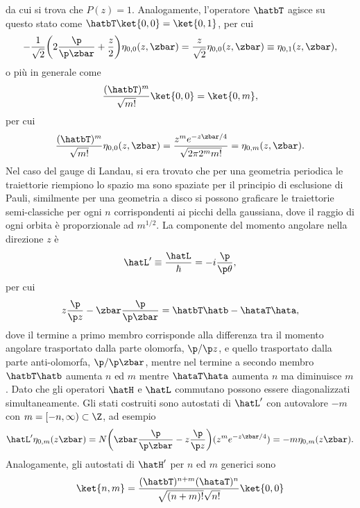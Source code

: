 da cui si trova che $P(z) = 1$. Analogamente, l'operatore $\hatbT$ agisce su questo stato come $\hatbT\ket{0,0} = \ket{0,1}$, per cui
\begin{equation}
    -\frac{1}{\sqrt{2}}\bigg(2\frac{\p}{\p\zbar} + \frac{z}{2} \bigg)\eta_{0,0}(z,\zbar) = \frac{z}{\sqrt{2}}\eta_{0,0}(z,\zbar) \equiv \eta_{0,1}(z,\zbar),
\end{equation}
o più in generale come
\begin{equation}
    \frac{(\hatbT)^m}{\sqrt{m!}}\ket{0,0} = \ket{0,m},
\end{equation}
per cui 
\begin{equation}
    \frac{(\hatbT)^m}{\sqrt{m!}}\eta_{0,0}(z,\zbar) = \frac{z^me^{-z\zbar/4}}{\sqrt{2\pi2^mm!}} = \eta_{0,m}(z,\zbar).
\end{equation}
Nel caso del gauge di Landau, si era trovato che per una geometria periodica le traiettorie riempiono lo spazio ma sono spaziate per il principio di esclusione di Pauli, similmente per una geometria a disco si possono graficare le traiettorie semi-classiche per ogni $n$ corrispondenti ai picchi della gaussiana, dove il raggio di ogni orbita è proporzionale ad $m^{1/2}$. La componente del momento angolare nella direzione $z$ è 
\begin{equation}
    \hatL' \equiv \frac{\hatL}{\hbar} = -i\frac{\p}{\p\theta},
\end{equation}
per cui
\begin{equation}
    z\frac{\p}{\p z} - \zbar\frac{\p}{\p \zbar} = \hatbT\hatb - \hataT\hata,
\end{equation}
dove il termine a primo membro corrisponde alla differenza tra il momento angolare trasportato dalla parte olomorfa, $\p/\p z$, e quello trasportato dalla parte anti-olomorfa, $\p/\p\zbar$, mentre nel termine a secondo membro $\hatbT\hatb$ aumenta $n$ ed $m$ mentre $\hataT\hata$ aumenta $n$ ma diminuisce $m$. Dato che gli operatori $\hatH$ e $\hatL$ commutano possono essere diagonalizzati simultaneamente. Gli stati costruiti sono autostati di $\hatL'$ con autovalore $-m$ con $m = [-n,\infty) \subset \Z$, ad esempio
\begin{equation}
    \hatL'\eta_{0,m}(z\zbar) = N\bigg(\zbar\frac{\p}{\p\zbar} - z\frac{\p}{\p z}\bigg)(z^me^{-z\zbar/4}) = -m\eta_{0,m}(z\zbar).
\end{equation}
Analogamente, gli autostati di $\hatH'$ per $n$ ed $m$ generici sono
\begin{equation}
    \ket{n,m} = \frac{(\hatbT)^{n+m}(\hataT)^n}{\sqrt{(n + m)!}\sqrt{n!}}\ket{0,0}
\end{equation}
